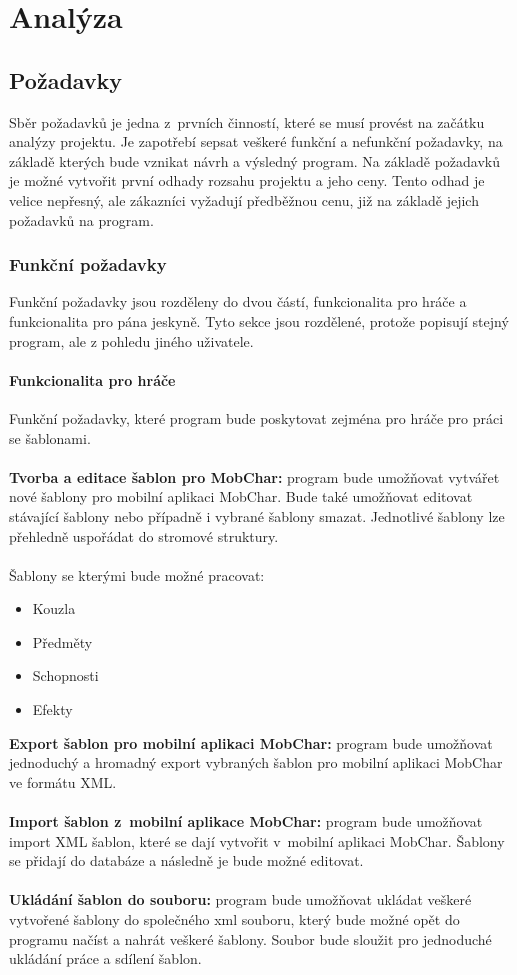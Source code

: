\documentclass[thesis=B,czech]{resources/FITthesis}[2012/06/26]
\begin{document}
\chapter{Analýza}
	\section{Požadavky}
Sběr požadavků je jedna z~prvních činností, které se musí provést na začátku analýzy projektu. Je zapotřebí sepsat veškeré funkční a nefunkční požadavky, na základě kterých bude vznikat návrh a výsledný program. Na základě požadavků je možné vytvořit první odhady rozsahu projektu a jeho ceny. Tento odhad je velice nepřesný, ale zákazníci vyžadují předběžnou cenu, již na základě jejich požadavků na program. 
	
\subsection{Funkční požadavky}
Funkční požadavky jsou rozděleny do dvou částí, funkcionalita pro hráče a funkcionalita pro pána jeskyně. Tyto sekce jsou rozdělené, protože popisují stejný program, ale z pohledu jiného uživatele.
\subsubsection{Funkcionalita pro hráče}
Funkční požadavky, které program bude poskytovat zejména pro hráče pro práci se šablonami.\\
\\
\textbf{Tvorba a editace šablon pro MobChar:} program bude umožňovat vytvářet nové šablony pro mobilní aplikaci MobChar. Bude také umožňovat editovat stávající šablony nebo případně i vybrané šablony smazat. Jednotlivé šablony lze přehledně uspořádat do stromové struktury.\\
\\
Šablony se kterými bude možné pracovat:
				\begin{itemize}
					\item Kouzla
					\item Předměty
					\item Schopnosti
					\item Efekty
				\end{itemize}
\textbf{Export šablon pro mobilní aplikaci MobChar:} program bude umožňovat jednoduchý a hromadný export vybraných šablon pro mobilní aplikaci MobChar ve formátu XML.\\
\\
\textbf{Import šablon z~mobilní aplikace MobChar:} program bude umožňovat import XML šablon, které se dají vytvořit v~mobilní aplikaci MobChar. Šablony se přidají do databáze a následně je bude možné editovat.\\
\\
\textbf{Ukládání šablon do souboru:} program bude umožňovat ukládat veškeré vytvořené šablony do společného xml souboru, který bude možné opět do programu načíst a nahrát veškeré šablony. Soubor bude sloužit pro jednoduché ukládání práce a sdílení šablon.
\end{document}
